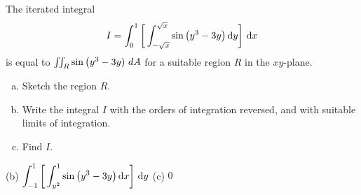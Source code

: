 \begin{question}[M200 2000D] %
The iterated integral
\begin{equation*}
I=\int_0^1\bigg[\int_{-\sqrt{x}}^{\sqrt{x}} \sin\big(y^3-3y\big)\,\mathrm{d}y\bigg]
         \ \mathrm{d}x
\end{equation*}
is equal to $\iint_R\sin\big(y^3-3y)\ dA$ for a suitable region $R$ in
the $xy$-plane.
\begin{enumerate}[(a)]
\item
Sketch the region $R$.

\item 
Write the integral $I$ with the orders of integration reversed,
and with suitable limits of integration.

\item 
Find $I$.
\end{enumerate}
\end{question}

%

\begin{answer}

(b) $\displaystyle\int_{-1}^1\bigg[\int_{y^2}^1 \sin\big(y^3-3y\big)\,\mathrm{d}x\bigg]\ \mathrm{d}y$
\qquad (c) $0$
\end{answer}

